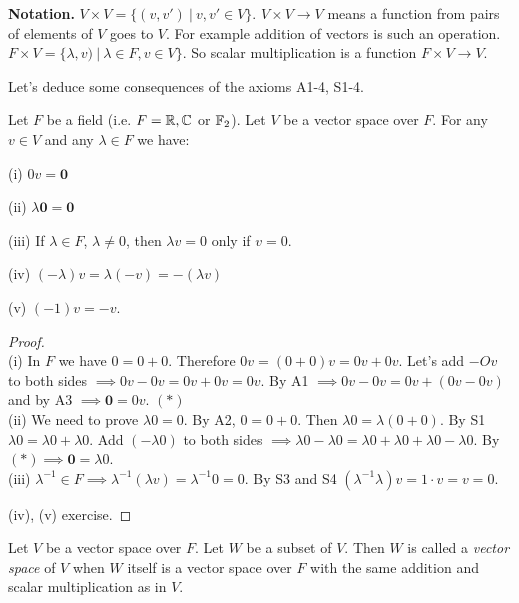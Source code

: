 \documentclass[10pt]{scrartcl}
\begin{document}
\textbf{Notation.} 
$V \times V = \{(v,v') ~|~ v,v' \in V\}$.	$V \times V \to V$ means a function from pairs of elements of $V$ goes to $V$. For example addition of vectors is such an operation. $F \times V = \{\lambda,v) ~|~ \lambda \in F, v \in V\}$. So scalar multiplication is a function $F \times V \to V$. 

Let's deduce some consequences of the axioms A1-4, S1-4.\\

\begin{proposition}
Let $F$ be a field (i.e. $F = \mathbb{R}, \mathbb{C}$ or $\mathbb{F}_2$). Let $V$ be a vector space over $F$. For any $v \in V$ and any $\lambda \in F$ we have:

(i) $0v = \mathbf{0}$	

(ii) $\lambda\mathbf{0} = \mathbf{0}$

(iii) If $\lambda \in F$, $\lambda \neq 0$, then $\lambda v= 0$ only if $v = 0$. 

(iv) $(-\lambda)v = \lambda(-v) = -(\lambda v)$

(v) $(-1)v = -v$. 
\end{proposition}

\begin{proof}~\\[.1cm]
(i) In $F$ we have $0 = 0 + 0$. Therefore $0v = (0+0)v = 0v + 0v$. Let's add $-Ov$ to both sides $\implies 0v - 0v = 0v + 0v = 0v$. By A1 $\implies 0v - 0v = 0v + (0v - 0v)$ and by A3 $\implies \mathbf{0} = 0v$. $(*)$\\

(ii) We need to prove $\lambda 0 = 0$. By A2, $0 = 0+0$. Then $\lambda 0 = \lambda(0 + 0)$. By S1 $\lambda 0 = \lambda 0 + \lambda 0$. Add $(-\lambda 0)$ to both sides $\implies \lambda 0 - \lambda 0 = \lambda 0 + \lambda 0 + \lambda 0 - \lambda 0$. By $(*) \implies \mathbf{0} = \lambda 0$.\\

(iii) $\lambda^{-1} \in F \implies \lambda^{-1}(\lambda v) = \lambda^{-1}0 = 0$. By S3 and S4 $(\lambda^{-1}\lambda)v = 1 \cdot v = v = 0$.

(iv), (v) exercise. 
\end{proof}







\vsp

\begin{definition}
Let $V$ be a vector space over $F$. Let $W$ be a subset of $V$. Then $W$ is called a \emph{vector space} of $V$ when $W$ itself is a vector space over $F$ with the same addition and scalar multiplication as in $V$. 
\end{definition}\vspace*{5pt}
\end{document}
